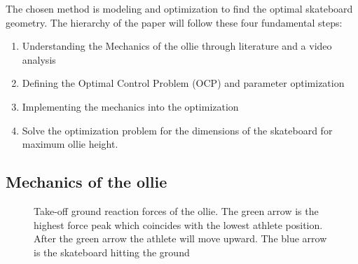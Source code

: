 \documentclass[default,iicol]{sn-jnl}
\theoremstyle{thmstyleone}%
\theoremstyle{thmstyletwo}%
\theoremstyle{thmstylethree}%
\begin{document}
The chosen method is modeling and optimization to find the optimal skateboard geometry. The hierarchy of the paper will follow these four fundamental steps: 
\begin{enumerate}
    \item Understanding the Mechanics of the ollie through literature and a video analysis
    \item Defining the Optimal Control Problem (OCP) and parameter optimization
    \item Implementing the mechanics into the optimization
    \item Solve the optimization problem for the dimensions of the skateboard for maximum ollie height. 
\end{enumerate}

\subsection{Mechanics of the ollie} \label{ss_mechanics}

\begin{figure}[b]

\caption[Ollie vertical ground reaction force]{Take-off ground reaction forces of the ollie. The green arrow is the highest force peak which coincides with the lowest athlete position. After the green arrow the athlete will move upward. The blue arrow is the skateboard hitting the ground \cite{frederick_biomechanics_2006}}
\label{f_GRF}
\end{figure}
\end{document}
